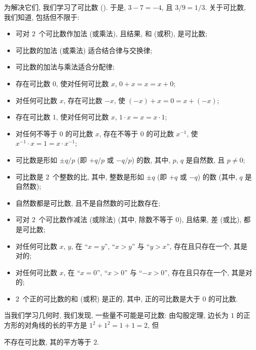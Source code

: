 \documentclass[../libro.tex]{subfiles}
\begin{document}
为解决它们, 我们学习了可比数 ().
于是, \(3 - 7 = -4\),
且 \(3 / 9 = 1 / 3\).
关于可比数, 我们知道, 包括但不限于:
\begin{itemize}
    \item 可对 \(2\)~个可比数作加法 (或乘法),
        且结果, 和 (或积), 是可比数;
    \item 可比数的加法 (或乘法) 适合结合律与交换律;
    \item 可比数的加法与乘法适合分配律;
    \item 存在可比数 \(0\), 使对任何可比数 \(x\),
        \(0 + x = x = x + 0\);
    \item 对任何可比数 \(x\), 存在可比数 \(-x\),
        使 \((-x) + x = 0 = x + (-x)\);
    \item 存在可比数 \(1\), 使对任何可比数 \(x\),
        \(1 \cdot x = x = x \cdot 1\);
    \item 对任何不等于 \(0\) 的可比数 \(x\),
        存在不等于 \(0\) 的可比数 \(x^{-1}\),
        使 \(x^{-1} \cdot x = 1 = x \cdot x^{-1}\);
    \item 可比数是形如
        \(\pm q/p\) (即 \(+q/p\) 或 \(-q/p\))
        的数,
        其中, \(p\), \(q\) 是自然数, 且 \(p \neq 0\);
    \item 可比数是 \(2\)~个整数的比,
        其中, 整数是形如
        \(\pm q\) (即 \(+q\) 或 \(-q\))
        的数
        (其中, \(q\) 是自然数);
    \item 自然数都是可比数, 且不是自然数的可比数存在;
    \item 可对 \(2\)~个可比数作减法 (或除法)
        (其中, 除数不等于 \(0\)),
        且结果, 差 (或比), 都是可比数;
    \item 对任何可比数 \(x\), \(y\),
        在 ``\(x = y\)'',
        ``\(x > y\)''
        与 ``\(y > x\)'',
        存在且只存在一个, 其是对的;
    \item 对任何可比数 \(x\),
        在 ``\(x = 0\)'',
        ``\(x > 0\)''
        与 ``\(-x > 0\)'',
        存在且只存在一个, 其是对的;
    \item \(2\)~个正的可比数的和 (或积) 是正的,
        其中, 正的可比数是大于 \(0\) 的可比数.
\end{itemize}

当我们学习几何时, 我们发现,
一些量不可能是可比数:
由勾股定理,
边长为 \(1\) 的正方形的对角线的长的平方是
\(1^2 + 1^2 = 1 + 1 = 2\),
但

\begin{theorem}
    不存在可比数, 其的平方等于 \(2\).
\end{theorem}
\end{document}

